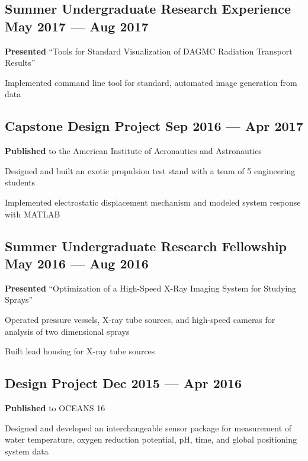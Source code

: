 \subsection{{Summer Undergraduate Research Experience \hfill May 2017 --- Aug 2017}}
\begin{zitemize}
\item \textbf{Presented} ``Tools for Standard Visualization of DAGMC Radiation Transport Results''
\item Implemented command line tool for standard, automated image generation from data
\end{zitemize}

\subsection{{Capstone Design Project \hfill Sep 2016 --- Apr 2017}}
\begin{zitemize}
\item \textbf{Published} to the American Institute of Aeronautics and Astronautics
\item Designed and built an exotic propulsion test stand with a team of 5 engineering students
\item Implemented electrostatic displacement mechanism and modeled system response with MATLAB
\end{zitemize}

\subsection{{Summer Undergraduate Research Fellowship \hfill May 2016 --- Aug 2016}}
\begin{zitemize}
\item \textbf{Presented} ``Optimization of a High-Speed X-Ray Imaging System for Studying Sprays''
\item Operated pressure vessels, X-ray tube sources, and high-speed cameras for analysis of two dimensional sprays
\item Built lead housing for X-ray tube sources
\end{zitemize}

\subsection{{Design Project \hfill Dec 2015 --- Apr 2016}}
\begin{zitemize}
\item \textbf{Published} to OCEANS 16
\item Designed and developed an interchangeable sensor package for measurement of water temperature, oxygen reduction potential, pH, time, and global positioning system data
\end{zitemize}

